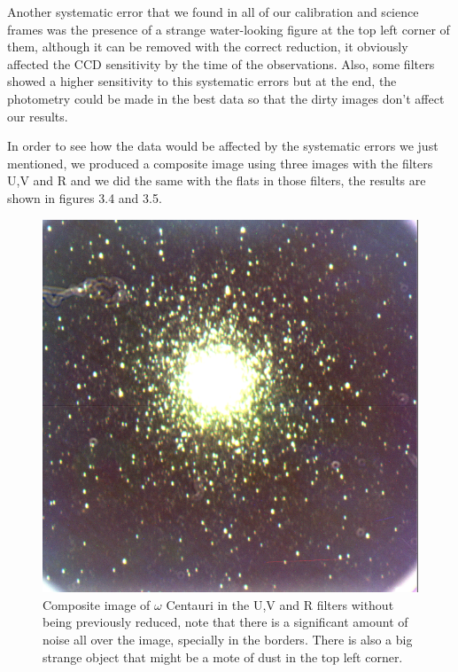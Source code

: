 Another systematic error that we found in all of our calibration and science frames was the presence of a strange water-looking figure at the top left corner of them, although it can be removed with the correct reduction, it obviously affected the CCD sensitivity by the time of the observations. Also, some filters showed a higher sensitivity to this systematic errors but at the end, the photometry could be made in the best data so that the dirty images don't affect our results.

In order to see how the data would be affected by the systematic errors we just mentioned, we produced a composite image using three images with the filters U,V and R and we did the same with the flats in those filters, the results are shown in figures 3.4 and 3.5.
  
\begin{figure}[]
  \centering
  \begin{minipage}[b]{0.47\textwidth}
    \includegraphics[width=\textwidth]{images/ngc_5139_dirty.png}
    \caption[Dirty image of NGC5139]{Composite image of $\omega$ Centauri in the U,V and R filters without being previously reduced, note that there is a significant amount of noise all over the image, specially in the borders. There is also a big strange object that might be a mote of dust in the top left corner.}
  \end{minipage}

\end{figure}
